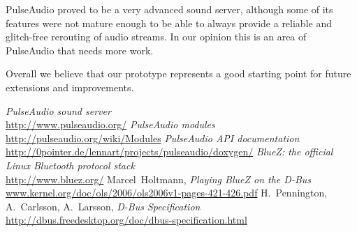 \documentclass[conference]{IEEEtran}
\begin{document}
PulseAudio proved to be a very advanced sound server, although some of its features were not mature enough to be able to always provide a reliable and glitch-free rerouting of audio streams. In our opinion this is an area of PulseAudio that needs more work.

Overall we believe that our prototype represents a good starting point for future extensions and improvements.


\begin{thebibliography}{1}
	\emph{PulseAudio sound server} \\
	\url{http://www.pulseaudio.org/}
	\emph{PulseAudio modules} \\
	\url{http://pulseaudio.org/wiki/Modules}
	\emph{PulseAudio API documentation} \\
	\url{http://0pointer.de/lennart/projects/pulseaudio/doxygen/}
	\emph{BlueZ: the official Linux Bluetooth protocol stack} \\
	\url{http://www.bluez.org/}
	Marcel~Holtmann,
	\emph{Playing BlueZ on the D-Bus} \\
	\url{www.kernel.org/doc/ols/2006/ols2006v1-pages-421-426.pdf}
	H.~Pennington, A.~Carlsson, A.~Larsson,
	\emph{D-Bus Specification} \\
	\url{http://dbus.freedesktop.org/doc/dbus-specification.html}
\end{thebibliography}
\end{document}
